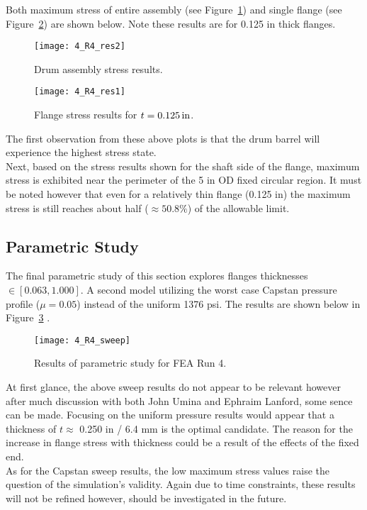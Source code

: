 Both maximum stress of entire assembly (see Figure~\ref{fig:4_R4_res2}) and single flange (see Figure~\ref{fig:4_R4_res1}) are shown below. Note these results are for 0.125 in thick flanges.

\begin{figure}[H]
	\centering
	\texttt{[image: 4\_R4\_res2]}
	\caption{Drum assembly stress results.}
	\label{fig:4_R4_res2}
\end{figure}
\begin{figure}[H]
	\centering
	\texttt{[image: 4\_R4\_res1]}
	\caption{Flange stress results for $t=0.125 \,\mathrm{in}$.}
	\label{fig:4_R4_res1}
\end{figure}

The first observation from these above plots is that the drum barrel will experience the highest stress state.\\

Next, based on the stress results shown for the shaft side of the flange, maximum stress is exhibited near the perimeter of the 5 in OD fixed circular region. It must be noted however that even for a relatively thin flange (0.125 in) the maximum stress is still reaches about half ($\approx 50.8\%$) of the allowable limit.

\subsection{Parametric Study}

The final parametric study of this section explores flanges thicknesses $\in [0.063, 1.000]$. A second model utilizing the worst case Capstan pressure profile ($\mu=0.05$) instead of the uniform 1376 psi. The results are shown below in Figure~\ref{fig:4_R4_sweep} \cite{EXCEL}.

\begin{figure}[H]
	\centering
	\texttt{[image: 4\_R4\_sweep]}
	\caption{Results of parametric study for FEA Run 4.}
	\label{fig:4_R4_sweep}
\end{figure}

At first glance, the above sweep results do not appear to be relevant however after much discussion with both John Umina and Ephraim Lanford, some sence can be made. Focusing on the uniform pressure results would appear that a thickness of $t\approx$ 0.250 in / 6.4 mm  is the optimal candidate. The reason for the increase in flange stress with thickness could be a result of the effects of the fixed end.\\

As for the Capstan sweep results, the low maximum stress values raise the question of the simulation's validity. Again due to time constraints, these results will not be refined however, should be investigated in the future.

